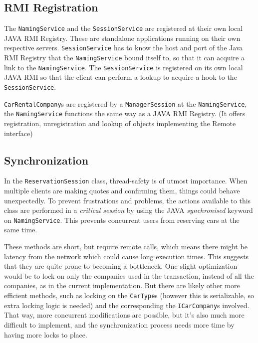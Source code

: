 \documentclass[a4paper]{article}
\begin{document}
\subsection{RMI Registration}
The \texttt{NamingService} and the \texttt{SessionService} are registered at their own local JAVA RMI Registry. These are standalone applications running on their own respective servers. \texttt{SessionService} has to know the host and port of the Java RMI Registry that the \texttt{NamingService} bound itself to, so that it can acquire a link to the \texttt{NamingService}. The \texttt{SessionService} is registered on its own local JAVA RMI so that the client can perform a lookup to acquire a hook to the \texttt{SessionService}.

\texttt{CarRentalCompany}s are registered by a \texttt{ManagerSession} at the \texttt{NamingService}, the \texttt{NamingService} functions the same way as a JAVA RMI Registry. (It offers registration, unregistration and lookup of objects implementing the Remote interface)

\subsection{Synchronization}
In the \texttt{ReservationSession} class, thread-safety is of utmost importance. When multiple clients are making quotes and confirming them, things could behave unexpectedly. To prevent frustrations and problems, the actions available to this class are performed in a \emph{critical session} by using the JAVA \emph{synchronised} keyword on \texttt{NamingService}. This prevents concurrent users from reserving cars at the same time.

These methods are short, but require remote calls, which means there might be latency from the network which could cause long execution times. This suggests that they are quite prone to becoming a bottleneck. One slight optimization would be to lock on only the companies used in the transaction, instead of all the companies, as in the current implementation. But there are likely other more efficient methods, such as locking on the \texttt{CarType}s (however this is serializable, so extra locking logic is needed) and the corresponding the \texttt{ICarCompany}s involved. That way, more concurrent modifications are possible, but it's also much more difficult to implement, and the synchronization process needs more time by having more locks to place.
\end{document}
